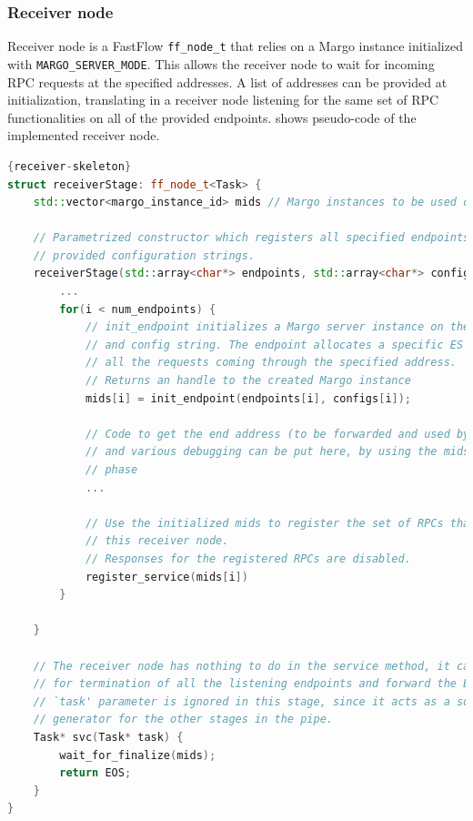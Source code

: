 \subsubsection{Receiver node}
Receiver node is a FastFlow \texttt{ff\_node\_t} that relies on a Margo instance initialized with \texttt{MARGO\_SERVER\_MODE}. This allows the receiver node to wait for incoming RPC requests at the specified addresses. A list of addresses can be provided at initialization, translating in a receiver node listening for the same set of RPC functionalities on all of the provided endpoints.  shows pseudo-code of the implemented receiver node.
\begin{lstlisting}[language=C++, style=mystyle, caption={Receiver node pseudo-code.}, label={receiver-skeleton}]{receiver-skeleton}
struct receiverStage: ff_node_t<Task> {
    std::vector<margo_instance_id> mids // Margo instances to be used during servicing

    // Parametrized constructor which registers all specified endpoints with the
    // provided configuration strings.
    receiverStage(std::array<char*> endpoints, std::array<char*> configs) {
        ...
        for(i < num_endpoints) {
            // init_endpoint initializes a Margo server instance on the provided address
            // and config string. The endpoint allocates a specific ES and pool to handle
            // all the requests coming through the specified address.
            // Returns an handle to the created Margo instance
            mids[i] = init_endpoint(endpoints[i], configs[i]);
            
            // Code to get the end address (to be forwarded and used by the sender node)
            // and various debugging can be put here, by using the mids generate by the init
            // phase
            ...
            
            // Use the initialized mids to register the set of RPCs that will be offered by
            // this receiver node.
            // Responses for the registered RPCs are disabled.
            register_service(mids[i])
        }
    
    }
    
    // The receiver node has nothing to do in the service method, it can simply wait
    // for termination of all the listening endpoints and forward the EOS at the end.
    // `task' parameter is ignored in this stage, since it acts as a sort of `endo-stream'
    // generator for the other stages in the pipe.
    Task* svc(Task* task) {
        wait_for_finalize(mids);
        return EOS;
    }
}
\end{lstlisting}

